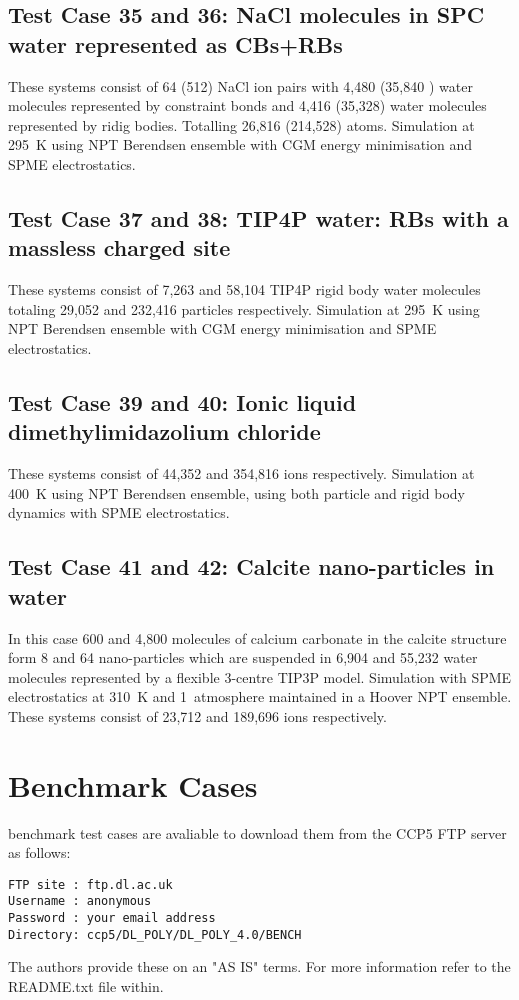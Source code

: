 \subsection{Test Case 35 and 36: NaCl molecules in SPC water represented as CBs+RBs}

These systems consist of 64 (512) NaCl ion pairs with 4,480 (35,840
) water molecules represented by constraint bonds and 4,416 (35,328)
water molecules represented by ridig bodies.  Totalling 26,816 (214,528)
atoms.  Simulation at 295~K using NPT Berendsen ensemble with CGM energy
minimisation and SPME electrostatics.

\subsection{Test Case 37 and 38: TIP4P water: RBs with a massless charged site}

These systems consist of 7,263 and 58,104 TIP4P rigid body water molecules
totaling 29,052 and 232,416 particles respectively.  Simulation at 295~K
using NPT Berendsen ensemble with CGM energy minimisation and SPME electrostatics.

\subsection{Test Case 39 and 40: Ionic liquid dimethylimidazolium chloride}

These systems consist of 44,352 and 354,816 ions respectively.  Simulation
at 400~K using NPT Berendsen ensemble, using both particle and rigid body
dynamics with SPME electrostatics.

\subsection{Test Case 41 and 42: Calcite nano-particles in water}

In this case 600 and 4,800 molecules of calcium carbonate in the calcite
structure form 8 and 64 nano-particles which are suspended in 6,904 and
55,232 water molecules represented by a flexible 3-centre TIP3P model.
Simulation with SPME electrostatics at 310~K and 1~atmosphere maintained
in a Hoover NPT ensemble.  These systems consist of 23,712 and 189,696
ions respectively.

\section{Benchmark Cases}

\D benchmark test cases are avaliable to download them from the CCP5 FTP
server as follows:

\begin{verbatim}
FTP site : ftp.dl.ac.uk
Username : anonymous
Password : your email address
Directory: ccp5/DL_POLY/DL_POLY_4.0/BENCH
\end{verbatim}

The \D authors provide these on an "AS IS" terms.  For more information
refer to the README.txt file within.
